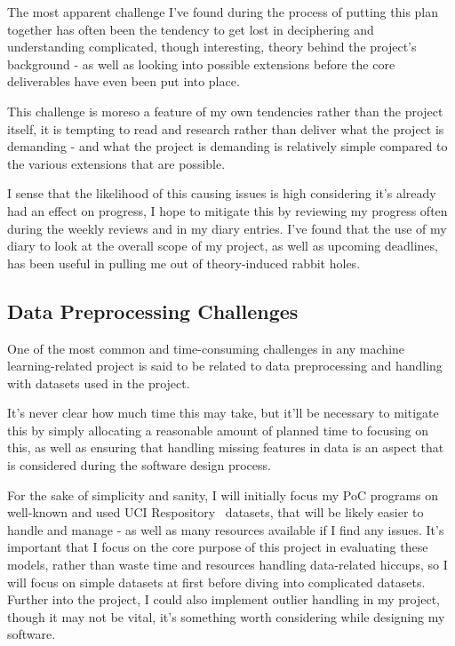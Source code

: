 \documentclass[report,10pt]{article}
\begin{document}
The most apparent challenge I've found during the process of putting this plan together has often been the tendency to get lost in deciphering and understanding complicated, though interesting, theory behind the project's background - as well as looking into possible extensions before the core deliverables have even been put into place. \par
This challenge is moreso a feature of my own tendencies rather than the project itself, it is tempting to read and research rather than deliver what the project is demanding - and what the project is demanding is relatively simple compared to the various extensions that are possible. \par
I sense that the likelihood of this causing issues is high considering it's already had an effect on progress, I hope to mitigate this by reviewing my progress often during the weekly reviews and in my diary entries. I've found that the use of my diary to look at the overall scope of my project, as well as upcoming deadlines, has been useful in pulling me out of theory-induced rabbit holes. 

\subsection{Data Preprocessing Challenges}

One of the most common and time-consuming challenges in any machine learning-related project is said to be related to data preprocessing and handling with datasets used in the project. \par
It's never clear how much time this may take, but it'll be necessary to mitigate this by simply allocating a reasonable amount of planned time to focusing on this, as well as ensuring that handling missing features in data is an aspect that is considered during the software design process. \par
For the sake of simplicity and sanity, I will initially focus my PoC programs on well-known and used UCI Respository~\cite{uci} datasets, that will be likely easier to handle and manage - as well as many resources available if I find any issues. It's important that I focus on the core purpose of this project in evaluating these models, rather than waste time and resources handling data-related hiccups, so I will focus on simple datasets at first before diving into complicated datasets. Further into the project, I could also implement outlier handling in my project, though it may not be vital, it's something worth considering while designing my software. \par
\end{document}
